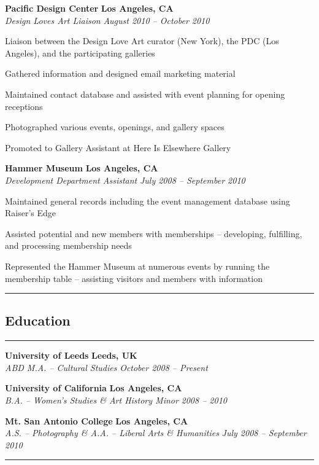 \documentclass[10pt,letterpaper]{article}			%
\newcommand{\JobHeader}[4]{							%
			\textbf{#1}
			\hfill
			\textbf{#2}
			\\
			\emph{#3}
			\hfill
			\emph{#4}\par 
			\vspace{-.8em}
			}
\newcommand{\InternHeader}[4]{							%
			\textbf{#1}
			\hfill
			\textbf{#2}
			\\
			\emph{#3}
			\hfill
			\emph{#4}\par 
			}
\begin{document}
			\vspace{-.6em}
	\JobHeader{Pacific Design Center}{Los Angeles, CA}{Design Loves Art Liaison}{August 2010 -- October 2010}
			\begin{itemize*}
			\item Liaison between the Design Love Art curator (New York), the PDC (Los Angeles), and the participating galleries
			\item Gathered information and designed email marketing material
			\item Maintained contact database and assisted with event planning for opening receptions
			\item Photographed various events, openings, and gallery spaces
			\item Promoted to Gallery Assistant at Here Is Elsewhere Gallery
			\end{itemize*}
			\vspace{-.6em}
	\JobHeader{Hammer Museum}{Los Angeles, CA}{Development Department Assistant}{July 2008 -- September 2010}
			\begin{itemize*}	
			\item Maintained general records including the event management database using Raiser's Edge
			\item Assisted potential and new members with memberships -- developing, fulfilling, and processing membership needs
			\item Represented the Hammer Museum at numerous events by running the membership table -- assisting visitors and members with information
			\end{itemize*}
			\vspace{-.4em}		
\hrule
\vspace{-1.4em}
\subsection*{Education}
\vspace{-.4em}
\hrule
\vspace{.4em}
	
	\InternHeader{University of Leeds}{Leeds, UK}{ABD M.A. -- Cultural Studies}{October 2008 -- Present}
	\InternHeader{University of California}{Los Angeles, CA}{B.A. -- Women's Studies \& Art History Minor}{2008 -- 2010}
	\InternHeader{Mt. San Antonio College}{Los Angeles, CA}{A.S. -- Photography \& A.A. -- Liberal Arts \& Humanities}{July 2008 -- September 2010}

\vspace{.4em}
\hrule
\vspace{-1.4em}
\end{document}
